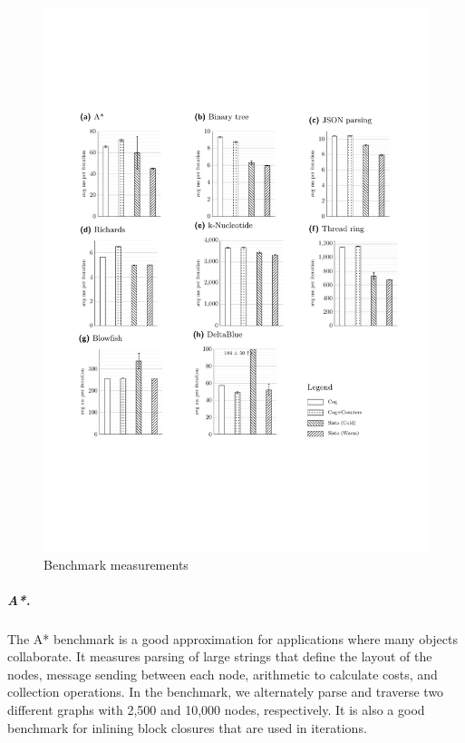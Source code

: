 \documentclass[a4paper,12pt,twoside]{../includes/ThesisStyle}
\begin{document}
\begin{figure}[h!]
    \begin{center}
        \includegraphics[width=\linewidth]{Bench}
        \caption{Benchmark measurements}
        \label{fig:measure}
    \end{center}
\end{figure}

\subparagraph{A*.}

The A* benchmark is a good approximation for applications where many objects collaborate. It measures parsing of large strings that define the layout of the nodes, message sending between each node, arithmetic to calculate costs, and collection operations. In the benchmark, we alternately parse and traverse two different graphs with 2,500 and 10,000 nodes, respectively. It is also a good benchmark for inlining block closures that are used in iterations.
\end{document}
